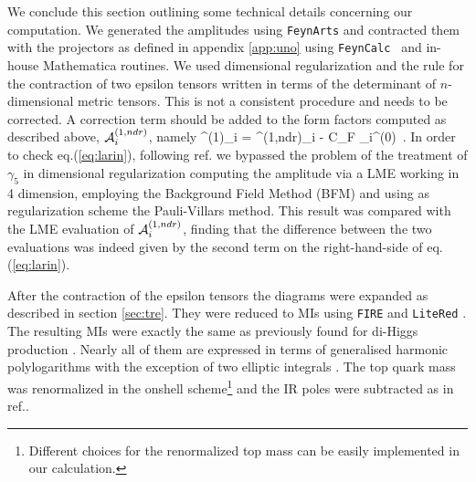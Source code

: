 We conclude this section outlining some technical details concerning our
computation.  We generated the amplitudes using \texttt{FeynArts} \cite{Hahn:2000kx} and
contracted them with the projectors as defined in appendix \ref{app:uno}
using \texttt{FeynCalc }\cite{Mertig:1990an,Shtabovenko:2016sxi} and in-house
Mathematica routines.  We used  dimensional regularization and
the rule for the contraction of two epsilon tensors written in terms of
the determinant of $n$-dimensional metric tensors. This is not a consistent
procedure and  needs to be corrected. A correction term should be added
\cite{Larin:1993tq} to the form factors computed as described
above, ${\cal A}^{(1,ndr)}_i$, namely
\beq
\amp^{(1)}_i = \amp^{(1,ndr)}_i -\frac{\as}{\pi} C_F \amp_i^{(0)}~.
\label{eq:larin}
\eeq
In order to check eq.(\ref{eq:larin}), following ref.\cite{Degrassi:2011vq}
we bypassed the problem of the treatment of 
$\gamma_5$ in dimensional regularization computing the amplitude via
a LME working in 4 dimension, employing the Background Field Method (BFM)
\cite{Abbott:1980hw} and using as regularization scheme  the Pauli-Villars
method. This result was compared with the LME evaluation of
${\cal A}^{(1,ndr)}_i$, finding that the difference between the two
evaluations was indeed given by the second term on the right-hand-side of
eq.(\ref{eq:larin}).

After the contraction of the epsilon tensors the diagrams were expanded as
described in section \ref{sec:tre}. They were reduced to MIs
using \texttt{FIRE} \cite{Smirnov:2014hma} and \texttt{LiteRed} \cite{Lee:2013mka}. The
resulting MIs were exactly the same as previously found for di-Higgs
production \cite{Bonciani:2018omm}. Nearly all of them are expressed
in terms of generalised harmonic polylogarithms with the exception of
two elliptic integrals \cite{vonManteuffel:2017hms, Bonciani:2018uvv}.
The top quark mass was renormalized in the onshell scheme\footnote{Different choices
	for the renormalized top mass can be easily implemented in our calculation.}
and the IR poles were subtracted as in ref.\cite{Degrassi:2016vss}.


